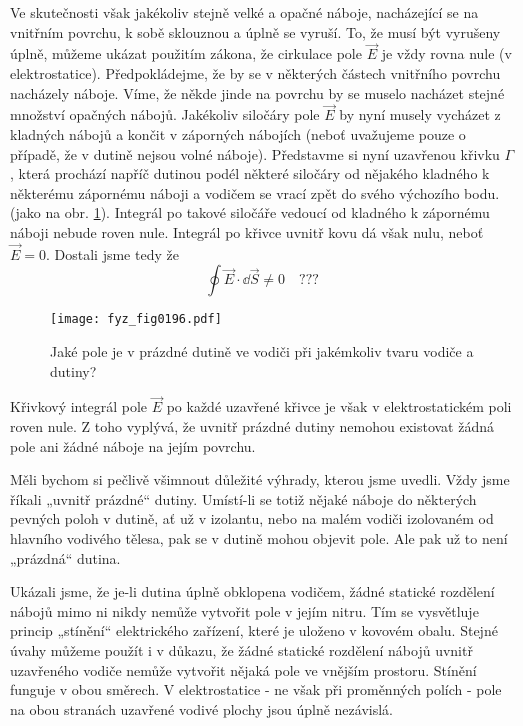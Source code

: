   Ve skutečnosti však jakékoliv stejně velké a opačné náboje, nacházející se na vnitřním 
  povrchu, k sobě sklouznou a úplně se vyruší. To, že musí být vyrušeny úplně, můžeme ukázat 
  použitím zákona, že cirkulace pole \(\vec{E}\) je vždy rovna nule (v elektrostatice). 
  Předpokládejme, že by se v některých částech vnitřního povrchu nacházely náboje. Víme, že 
  někde jinde na povrchu by se muselo nacházet stejné množství  opačných nábojů. Jakékoliv 
  siločáry pole \(\vec{E}\) by nyní musely vycházet z kladných nábojů a končit v záporných 
  nábojích (neboť uvažujeme pouze o případě, že v dutině nejsou volné náboje). Představme si 
  nyní uzavřenou křivku \(\Gamma\), která prochází napříč dutinou podél některé siločáry od 
  nějakého kladného k některému zápornému náboji a vodičem se vrací zpět do svého výchozího 
  bodu. (jako na obr. \ref{fyz:fig0196}). Integrál po takové siločáře vedoucí od kladného k 
  zápornému náboji nebude roven nule. Integrál po křivce uvnitř kovu dá však nulu, 
  neboť \(\vec{E}=0\). Dostali jsme tedy že
  \begin{equation}\label{fyz:eq_fey_elstat_gauss08}
    \oint \vec{E}\cdot\dd{\vec{S}} \neq 0  \quad ???
  \end{equation}

  \begin{figure}[ht!] %
    \centering
    \texttt{[image: fyz\_fig0196.pdf]}
    \caption{Jaké pole je v prázdné dutině ve vodiči při jakémkoliv tvaru vodiče a dutiny?}
    \label{fyz:fig0196}
  \end{figure}
  Křivkový integrál pole \(\vec{E}\) po každé uzavřené křivce je však v elektrostatickém poli 
  roven nule. Z toho vyplývá, že uvnitř prázdné dutiny nemohou existovat žádná pole ani žádné 
  náboje na jejím povrchu.
  
  Měli bychom si pečlivě všimnout důležité výhrady, kterou jsme uvedli. Vždy jsme říkali 
  „uvnitř prázdné“ dutiny. Umístí-li se totiž nějaké náboje do některých pevných poloh v 
  dutině, ať už v izolantu, nebo na malém vodiči izolovaném od hlavního vodivého tělesa, pak se 
  v dutině mohou objevit pole. Ale pak už to není „prázdná“ dutina.
  
  Ukázali jsme, že je-li dutina úplně obklopena vodičem, žádné statické rozdělení nábojů mimo 
  ni nikdy nemůže vytvořit pole v jejím nitru. Tím se vysvětluje princip „stínění“ elektrického 
  zařízení, které je uloženo v kovovém obalu. Stejné úvahy můžeme použít i v důkazu, že žádné 
  statické rozdělení nábojů uvnitř uzavřeného vodiče nemůže vytvořit nějaká pole ve vnějším 
  prostoru. Stínění funguje v obou směrech. V elektrostatice - ne však při proměnných polích - 
  pole na obou stranách uzavřené vodivé plochy jsou úplně nezávislá.
  
